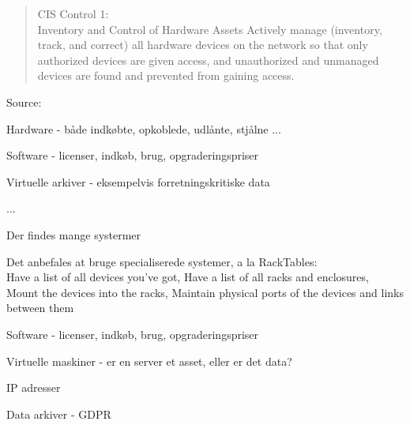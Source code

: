\documentclass[Screen16to9,17pt]{foils}
\begin{document}

\begin{quote}
CIS Control 1:\\
Inventory and Control of Hardware Assets
Actively manage (inventory, track, and correct) all hardware devices on the network so that only
authorized devices are given access, and unauthorized and unmanaged devices are found and
prevented from gaining access.
\end{quote}
Source: 

\begin{list2}
\item Hardware - både indkøbte, opkoblede, udlånte, stjålne ...
\item Software - licenser, indkøb, brug, opgraderingspriser
\item Virtuelle arkiver - eksempelvis forretningskritiske data
\item ...
\end{list2}



\begin{list2}
\item Der findes mange systermer
\item Det anbefales at bruge specialiserede systemer, a la RackTables:\\
Have a list of all devices you've got,
Have a list of all racks and enclosures,
Mount the devices into the racks,
Maintain physical ports of the devices and links between them
\end{list2}



\begin{list2}
\item Software - licenser, indkøb, brug, opgraderingspriser
\item Virtuelle maskiner - er en server et asset, eller er det data?
\item IP adresser
\item Data arkiver - GDPR
\end{list2}


\end{document}

